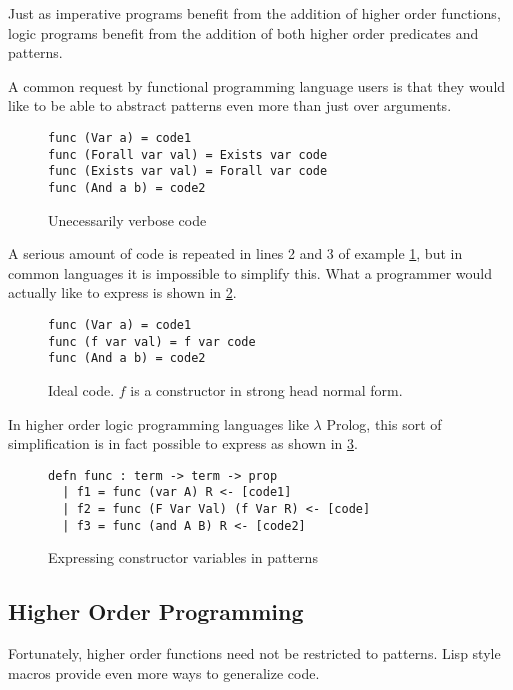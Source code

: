 Just as imperative programs benefit from the addition of higher order functions, logic programs benefit from the addition of both
higher order predicates and patterns.  

A common request by functional programming language users is that they would like to be able to abstract patterns even more than just over
arguments.  

\begin{figure}[H]
\begin{lstlisting}
func (Var a) = code1
func (Forall var val) = Exists var code
func (Exists var val) = Forall var code
func (And a b) = code2
\end{lstlisting}
\caption{Unecessarily verbose code}
\label{code:verbose}
\end{figure}

A serious amount of code is repeated in lines 2 and 3 of example \ref{code:verbose}, 
but in common languages it is impossible to simplify this.
What a programmer would actually like to express is shown in \ref{code:Fideal}.

\begin{figure}[H]
\begin{lstlisting}
func (Var a) = code1
func (f var val) = f var code
func (And a b) = code2
\end{lstlisting}
\caption{Ideal code. $f$ is a constructor in strong head normal form.}
\label{code:Fideal}
\end{figure}

In higher order logic programming languages like $\lambda$ Prolog, this sort of simplification 
is in fact possible to express as shown in \ref{code:lprolog}.

\begin{figure}[H]
\begin{lstlisting}
defn func : term -> term -> prop 
  | f1 = func (var A) R <- [code1]
  | f2 = func (F Var Val) (f Var R) <- [code]
  | f3 = func (and A B) R <- [code2]
\end{lstlisting}
\caption{Expressing constructor variables in patterns}
\label{code:lprolog}
\end{figure}

\FloatBarrier
\subsection{Higher Order Programming}

Fortunately, higher order functions need not be restricted to patterns.  Lisp style macros provide even more ways
to generalize code.  

